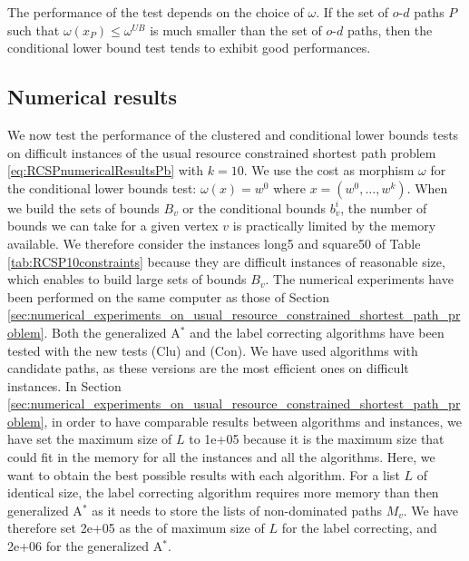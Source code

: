 \documentclass[11pt]{amsart}
\theoremstyle{plain}
\theoremstyle{remark}
\newcommand{\re}{x}
\begin{document}
The performance of the test depends on the choice of $\omega$. If the set of $o$-$d$ paths $P$ such that $\omega(\re_{P})\leq \omega^{UB}$ is much smaller than the set of $o$-$d$ paths, then the conditional lower bound test tends to exhibit good performances.

\subsection{Numerical results} \label{sub:numerical_results}



We now test the performance of the clustered and conditional lower bounds tests on difficult instances of the usual resource constrained shortest path problem \eqref{eq:RCSPnumericalResultsPb} with $k=10$. We use the cost as morphism $\omega$ for the conditional lower bounds test: $\omega(\re) = w^{0}$ where $\re = (w^{0},\ldots,w^{k})$. When we build the sets of bounds $B_{v}$ or the conditional bounds $b_{v}^{i}$, the number of bounds we can take for a given vertex $v$ is practically limited by the memory available. We therefore consider the instances long5 and square50 of Table \ref{tab:RCSP10constraints} because they are difficult instances of reasonable size, which enables to build large sets of bounds $B_{v}$. The numerical experiments have been performed on the same computer as those of Section \ref{sec:numerical_experiments_on_usual_resource_constrained_shortest_path_problem}. Both the generalized A$^{*}$ and the label correcting algorithms have been tested with the new tests (Clu) and (Con). We have used algorithms with candidate paths, as these versions are the most efficient ones on difficult instances.  In Section \ref{sec:numerical_experiments_on_usual_resource_constrained_shortest_path_problem}, in order to have comparable results between algorithms and instances, we have set the maximum size of $L$ to 1e+05 because it is the maximum size that could fit in the memory for all the instances and all the algorithms. Here, we want to obtain the best possible results with each algorithm. For a list $L$ of identical size, the label correcting algorithm requires more memory than then generalized A$^{*}$ as it needs to store the lists of non-dominated paths $M_{v}$. We have therefore set 2e+05 as the of maximum size of $L$ for the label correcting, and 2e+06 for the generalized A$^{*}$.
\end{document}
